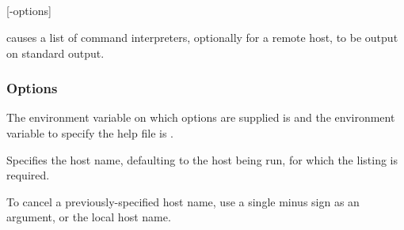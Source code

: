 \subsection{\BtcilistName}

\begin{expara}

\BtcilistName{} [-options]

\end{expara}

\PrBtcilist{} causes a list of command interpreters, optionally for a remote host, to be output on standard output.

\subsubsection{Options}
The environment variable on which options are supplied is \filename{\BtcilistVarname} and the environment variable to specify
the help file is .

\explainopt


Specifies the host name, defaulting to the host being run, for which the listing is required.

To cancel a previously-specified host name, use a single minus sign as an argument, or the local host name.

\freezeopts{\filename{\BtcilistVarname}}{}

